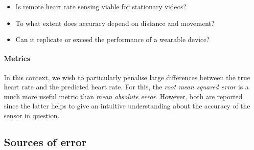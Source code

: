 % 
\begin{itemize}
    \item Is remote heart rate sensing viable for stationary videos?
    \item To what extent does accuracy depend on distance and movement?
    \item Can it replicate or exceed the performance of a wearable device?
\end{itemize}

\paragraph{Metrics}
In this context, we wish to particularly penalise large differences between the true heart rate and the predicted heart rate. For this, 
the \textit{root mean squared error} is a much more useful metric than \textit{mean absolute error}. However, both are reported since the latter helps
to give an intuitive understanding about the accuracy of the sensor in question.


\subsection{Sources of error}




